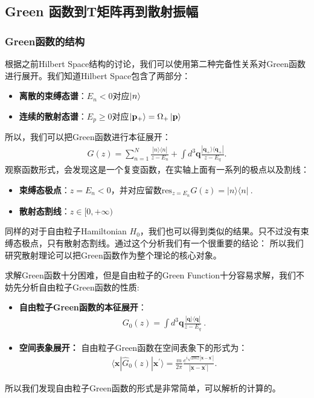 \subsection{Green 函数到T矩阵再到散射振幅}

\subsubsection{Green函数的结构}


根据之前Hilbert Space结构的讨论，我们可以使用第二种完备性关系对Green函数进行展开。我们知道Hilbert Space包含了两部分：
\begin{itemize}
  \item \textbf{离散的束缚态谱}：$ E_n < 0 $对应$ \ket{n} $
  \item \textbf{连续的散射态谱}：$ E_p \geq 0 $对应$ \ket{\mathbf{p}_+} =
    \Omega_+\ket{\mathbf{p}}  $
\end{itemize}
所以，我们可以把Green函数进行本征展开：
\begin{align}
  G(z)=\sum_{n=1}^N\frac{|n\rangle\langle n|}{z-E_n}+\int
  d^3\mathbf{q}\frac{|\mathbf{q}_+\rangle\langle\mathbf{q}_+|}{z-E_q}.
\end{align}
观察函数形式，会发现这是一个复变函数，在实轴上面有一系列的极点以及割线：
\begin{itemize}
  \item \textbf{束缚态极点}：$ z=E_n<0 $，并对应留数$
    \mathrm{res}_{z=E_n}G(z)=|n\rangle\langle n|\mathrm{~.} $
  \item \textbf{散射态割线}：$ z\in[0,+\infty) $
\end{itemize}
同样的对于自由粒子Hamiltonian $ H_0 $，我们也可以得到类似的结果。只不过没有束缚态极点，只有散射态割线。通过这个分析我们有一个很重要的结论：
所以我们研究散射理论可以把Green函数作为整个理论的核心对象。

\bigskip
{}

求解Green函数十分困难，但是自由粒子的Green Function十分容易求解，我们不妨先分析自由粒子Green函数的性质:
\begin{itemize}
  \item \textbf{自由粒子Green函数的本征展开}：
    \begin{align}
      G_0(z)=\int
      d^3\mathbf{q}\frac{|\mathbf{q}\rangle\langle\mathbf{q}|}{z-E_q}\mathrm{~.}
    \end{align}
  \item \textbf{空间表象展开：}
    自由粒子Green函数在空间表象下的形式为：
    \begin{align}\label{eq:free_particle_green_function}
      \langle\mathbf{x}|\hat{G}_{0}(z)|\mathbf{x}^{\prime}\rangle=\frac{m}{2\pi}\frac{e^{i\sqrt{2mz}|\mathbf{x}-\mathbf{x}^{\prime}|}}{|\mathbf{x}-\mathbf{x}^{\prime}|}.
    \end{align}
\end{itemize}
所以我们发现自由粒子Green函数的形式是非常简单，可以解析的计算的。

